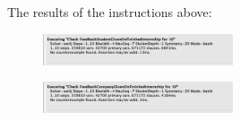The results of the instructions above:

\begin{figure}[h!]
    \centering\includegraphics[width=0.5\textwidth]{RASD/Images/Alloy/checkFeedbackStudentGivenOnFinishedInternship.png}
    \label{fig:checkFeedbackStudentGivenOnFinishedInternship}
\end{figure}
\begin{figure}[h!]
    \centering\includegraphics[width=0.5\textwidth]{RASD/Images/Alloy/checkFeedbackCompanyGivenOnFinishedInternship.png}
    \label{fig:checkFeedbackCompanyGivenOnFinishedInternship}
\end{figure}